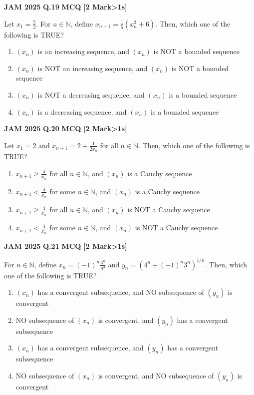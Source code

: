 \documentclass[11pt,a4paper]{article}
\newcommand{\pyqheader}[4]{%
    \noindent\begin{tcolorbox}[
        colback=badgebg,
        colframe=secondary,
        arc=2mm,
        boxrule=0.6pt,
        top=1.5mm,bottom=1.5mm,left=2mm,right=2mm
    ]
        \textbf{\textcolor{primary}{JAM #1}} \hfill \textbf{Q.#2} \hfill \textsc{\textbf{#3}} \hfill \textbf{[#4 Mark\ifnum#4>1s\fi]}
    \end{tcolorbox}\vspace{-1mm}
}
\begin{document}
\pyqheader{2025}{19}{MCQ}{2}
Let $x_{1}=\frac{5}{2}$. For $n\in\mathbb{N}$, define $x_{n+1}=\frac{1}{5}(x_{n}^{2}+6)$. Then, which one of the following is TRUE?
\begin{enumerate}[label=(\Alph*)]
    \item $(x_{n})$ is an increasing sequence, and $(x_{n})$ is NOT a bounded sequence
    \item $(x_{n})$ is NOT an increasing sequence, and $(x_{n})$ is NOT a bounded sequence
    \item $(x_{n})$ is NOT a decreasing sequence, and $(x_{n})$ is a bounded sequence
    \item $(x_{n})$ is a decreasing sequence, and $(x_{n})$ is a bounded sequence
\end{enumerate}

\pyqheader{2025}{20}{MCQ}{2}
Let $x_{1}=2$ and $x_{n+1}=2+\frac{1}{2x_{n}}$ for all $n\in\mathbb{N}$. Then, which one of the following is TRUE?
\begin{enumerate}[label=(\Alph*)]
    \item $x_{n+1}\ge\frac{4}{x_{n}}$ for all $n\in\mathbb{N}$, and $(x_{n})$ is a Cauchy sequence
    \item $x_{n+1}<\frac{4}{x_{n}}$ for some $n\in\mathbb{N}$, and $(x_{n})$ is a Cauchy sequence
    \item $x_{n+1}\ge\frac{4}{x_{n}}$ for all $n\in\mathbb{N}$, and $(x_{n})$ is NOT a Cauchy sequence
    \item $x_{n+1}<\frac{4}{x_{n}}$ for some $n\in\mathbb{N}$, and $(x_{n})$ is NOT a Cauchy sequence
\end{enumerate}

\pyqheader{2025}{21}{MCQ}{2}
For $n\in\mathbb{N}$, define $x_{n}=(-1)^{n}\frac{3^{n}}{n^{3}}$ and $y_{n}=(4^{n}+(-1)^{n}3^{n})^{1/n}$. Then, which one of the following is TRUE?
\begin{enumerate}[label=(\Alph*)]
    \item $(x_{n})$ has a convergent subsequence, and NO subsequence of $(y_{n})$ is convergent
    \item NO subsequence of $(x_{n})$ is convergent, and $(y_{n})$ has a convergent subsequence
    \item $(x_{n})$ has a convergent subsequence, and $(y_{n})$ has a convergent subsequence
    \item NO subsequence of $(x_{n})$ is convergent, and NO subsequence of $(y_{n})$ is convergent
\end{enumerate}
\end{document}
